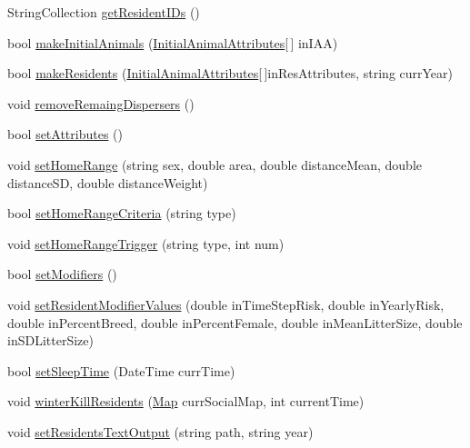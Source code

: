 \begin{DoxyCompactItemize}
\item 
String\-Collection \hyperlink{class_s_e_a_r_c_h_1_1_animal_manager_a031aa25ed9a846b311c03fdc471c43b9}{get\-Resident\-I\-Ds} ()
\item 
bool \hyperlink{class_s_e_a_r_c_h_1_1_animal_manager_a094207a7ccfbb164a70c04d656e4abd4}{make\-Initial\-Animals} (\hyperlink{class_s_e_a_r_c_h_1_1_initial_animal_attributes}{Initial\-Animal\-Attributes}\mbox{[}$\,$\mbox{]} in\-I\-A\-A)
\item 
bool \hyperlink{class_s_e_a_r_c_h_1_1_animal_manager_abfbe471dbe58fa2b56c0e353832369d7}{make\-Residents} (\hyperlink{class_s_e_a_r_c_h_1_1_initial_animal_attributes}{Initial\-Animal\-Attributes}\mbox{[}$\,$\mbox{]}in\-Res\-Attributes, string curr\-Year)
\item 
void \hyperlink{class_s_e_a_r_c_h_1_1_animal_manager_a050fac140af923a69fa649cfa8d77c93}{remove\-Remaing\-Dispersers} ()
\item 
bool \hyperlink{class_s_e_a_r_c_h_1_1_animal_manager_aa980efa432568bc8f7089e196834bf0b}{set\-Attributes} ()
\item 
void \hyperlink{class_s_e_a_r_c_h_1_1_animal_manager_a5757f4786a35939a635bdbc42dc96af0}{set\-Home\-Range} (string sex, double area, double distance\-Mean, double distance\-S\-D, double distance\-Weight)
\item 
bool \hyperlink{class_s_e_a_r_c_h_1_1_animal_manager_adb607f1396228db4657023b5395bb872}{set\-Home\-Range\-Criteria} (string type)
\item 
void \hyperlink{class_s_e_a_r_c_h_1_1_animal_manager_a45b122d488534474f9824e4bd58bfa54}{set\-Home\-Range\-Trigger} (string type, int num)
\item 
bool \hyperlink{class_s_e_a_r_c_h_1_1_animal_manager_ab0c4db81bb8b9152af18b2b2263a2684}{set\-Modifiers} ()
\item 
void \hyperlink{class_s_e_a_r_c_h_1_1_animal_manager_a0239f416e2332da5288e4cae87984d8a}{set\-Resident\-Modifier\-Values} (double in\-Time\-Step\-Risk, double in\-Yearly\-Risk, double in\-Percent\-Breed, double in\-Percent\-Female, double in\-Mean\-Litter\-Size, double in\-S\-D\-Litter\-Size)
\item 
bool \hyperlink{class_s_e_a_r_c_h_1_1_animal_manager_a707210bc35dde5c75c0601116b71e1ff}{set\-Sleep\-Time} (Date\-Time curr\-Time)
\item 
void \hyperlink{class_s_e_a_r_c_h_1_1_animal_manager_a04a6d2cfcda981b0c2775f7f3d1fa652}{winter\-Kill\-Residents} (\hyperlink{class_s_e_a_r_c_h_1_1_map}{Map} curr\-Social\-Map, int current\-Time)
\item 
void \hyperlink{class_s_e_a_r_c_h_1_1_animal_manager_af1f2d68341a4cfef2d8c8e8ad487e58e}{set\-Residents\-Text\-Output} (string path, string year)
\end{DoxyCompactItemize}
